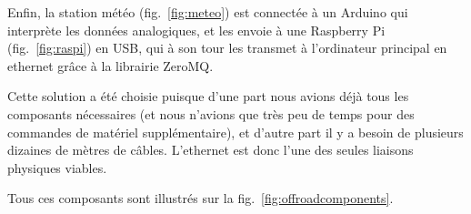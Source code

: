 \documentclass[french,A4paper,]{book}
\begin{document}
Enfin, la station météo (fig.~\ref{fig:meteo}) est connectée à un
Arduino qui interprète les données analogiques, et les envoie à une
Raspberry Pi (fig.~\ref{fig:raspi}) en USB, qui à son tour les transmet
à l'ordinateur principal en ethernet grâce à la librairie ZeroMQ.

Cette solution a été choisie puisque d'une part nous avions déjà tous
les composants nécessaires (et nous n'avions que très peu de temps pour
des commandes de matériel supplémentaire), et d'autre part il y a besoin
de plusieurs dizaines de mètres de câbles. L'ethernet est donc l'une des
seules liaisons physiques viables.

Tous ces composants sont illustrés sur la
fig.~\ref{fig:offroadcomponents}.

\begin{figure}
\centering

\hspace*{\fill}
\hfill%
\hspace*{\fill}


\end{figure}
\end{document}
